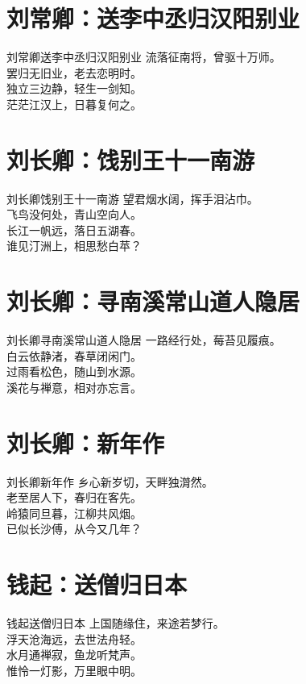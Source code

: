 \documentclass[12pt,oneside,a5paper]{book}
\begin{document}
\chapter{刘常卿：送李中丞归汉阳别业}
\begin{poemzh}{刘常卿}{送李中丞归汉阳别业}
流落征南将，曾驱十万师。\\
罢归无旧业，老去恋明时。\\
独立三边静，轻生一剑知。\\
茫茫江汉上，日暮复何之。\\ 
\end{poemzh}

\chapter{刘长卿：饯别王十一南游}
\begin{poemzh}{刘长卿}{饯别王十一南游}
望君烟水阔，挥手泪沾巾。\\
飞鸟没何处，青山空向人。\\
长江一帆远，落日五湖春。\\
谁见汀洲上，相思愁白苹？\\ 
\end{poemzh}

\chapter{刘长卿：寻南溪常山道人隐居}
\begin{poemzh}{刘长卿}{寻南溪常山道人隐居}
一路经行处，莓苔见履痕。\\
白云依静渚，春草闭闲门。\\
过雨看松色，随山到水源。\\
溪花与禅意，相对亦忘言。\\ 
\end{poemzh}

\chapter{刘长卿：新年作}
\begin{poemzh}{刘长卿}{新年作}
乡心新岁切，天畔独潸然。\\
老至居人下，春归在客先。\\
岭猿同旦暮，江柳共风烟。\\
已似长沙傅，从今又几年？\\ 
\end{poemzh}

\chapter{钱起：送僧归日本}
\begin{poemzh}{钱起}{送僧归日本}
上国随缘住，来途若梦行。\\
浮天沧海远，去世法舟轻。\\
水月通禅寂，鱼龙听梵声。\\
惟怜一灯影，万里眼中明。\\ 
\end{poemzh}
\end{document}
